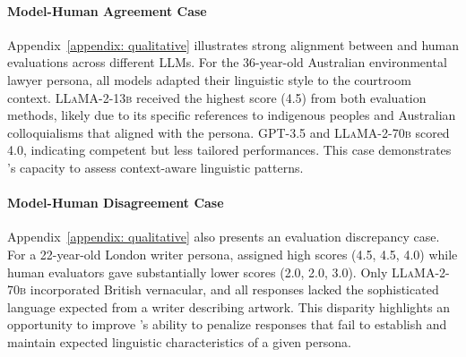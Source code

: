 \paragraph{Model-Human Agreement Case}
Appendix~\ref{appendix: qualitative} illustrates strong alignment between \benchmark and human evaluations across different LLMs. For the 36-year-old Australian environmental lawyer persona, all models adapted their linguistic style to the courtroom context. \textsc{LLaMA-2-13b} received the highest score (4.5) from both evaluation methods, likely due to its specific references to indigenous peoples and Australian colloquialisms that aligned with the persona. \textsc{GPT-3.5} and \textsc{LLaMA-2-70b} scored 4.0, indicating competent but less tailored performances. This case demonstrates \benchmark's capacity to assess context-aware linguistic patterns.

\paragraph{Model-Human Disagreement Case}
Appendix~\ref{appendix: qualitative} also presents an evaluation discrepancy case. For a 22-year-old London writer persona, \benchmark assigned high scores (4.5, 4.5, 4.0) while human evaluators gave substantially lower scores (2.0, 2.0, 3.0). Only \textsc{LLaMA-2-70b} incorporated British vernacular, and all responses lacked the sophisticated language expected from a writer describing artwork. This disparity highlights an opportunity to improve \benchmark's ability to penalize responses that fail to establish and maintain expected linguistic characteristics of a given persona.


